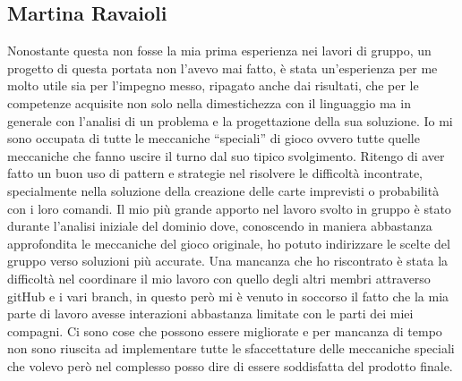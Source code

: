 \subsection{Martina Ravaioli}

Nonostante questa non fosse la mia prima esperienza nei lavori di gruppo, 
un progetto di questa portata non l'avevo mai fatto, è stata un’esperienza per me molto utile 
sia per l’impegno messo, ripagato anche dai risultati, che per le competenze acquisite 
non solo nella dimestichezza con il linguaggio ma in generale con l’analisi di un problema e la progettazione della sua soluzione. 
Io mi sono occupata di tutte le meccaniche “speciali” di gioco ovvero 
tutte quelle meccaniche che fanno uscire il turno dal suo tipico svolgimento. 
Ritengo di aver fatto un buon uso di pattern e strategie nel risolvere le difficoltà incontrate, 
specialmente nella soluzione della creazione delle carte imprevisti o probabilità con i loro comandi.
Il mio più grande apporto nel lavoro svolto in gruppo è stato durante l’analisi iniziale del dominio dove, 
conoscendo in maniera abbastanza approfondita le meccaniche del gioco originale, ho potuto indirizzare 
le scelte del gruppo verso soluzioni più accurate.
Una mancanza che ho riscontrato è stata la difficoltà nel coordinare il mio lavoro 
con quello degli altri membri attraverso gitHub e i vari branch, in questo però mi è venuto in soccorso il fatto che 
la mia parte di lavoro avesse interazioni abbastanza limitate con le parti dei miei compagni.
Ci sono cose che possono essere migliorate e per mancanza di tempo non sono riuscita ad implementare 
tutte le sfaccettature delle meccaniche speciali che volevo però nel complesso 
posso dire di essere soddisfatta del prodotto finale. 

